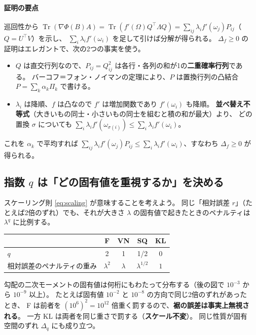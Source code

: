 \documentclass[a4paper,11pt]{ltjsarticle}
\theoremstyle{definition}
\theoremstyle{plain}
\DeclareMathOperator{\Tr}{Tr}
\newcommand{\T}{^{\top}}
\begin{document}
\paragraph{証明の要点}
巡回性から $\Tr(\nabla\Phi(B)A) = \Tr(f'(\Omega)Q\T\Lambda Q) = \sum_{ij}\lambda_if'(\omega_j)P_{ij}$（$Q = U\T V$）を示し、
$\sum_i\lambda_if'(\omega_i)$ を足して引けば分解が得られる。
$\Delta_f\ge0$ の証明はエレガントで、次の2つの事実を使う。
\begin{itemize}
  \item $Q$ は直交行列なので、$P_{ij} = Q_{ij}^2$ は各行・各列の和が1の\textbf{二重確率行列}である。
        バーコフ＝フォン・ノイマンの定理により、$P$ は置換行列の凸結合 $P = \sum_k\alpha_k\Pi_k$ で書ける。
  \item $\lambda_i$ は降順、$f$ は凸なので $f'$ は増加関数であり $f'(\omega_i)$ も降順。
        \textbf{並べ替え不等式}（大きいもの同士・小さいもの同士を組むと積の和が最大）より、
        どの置換 $\sigma$ についても $\sum_i\lambda_if'(\omega_{\sigma(i)})\le\sum_i\lambda_if'(\omega_i)$。
\end{itemize}
これを $\alpha_k$ で平均すれば $\sum_{ij}\lambda_if'(\omega_j)P_{ij}\le\sum_i\lambda_if'(\omega_i)$、すなわち $\Delta_f\ge0$ が得られる。

\subsection{指数 $q$ は「どの固有値を重視するか」を決める}

スケーリング則 \eqref{eq:scaling} が意味することを考えよう。
同じ「相対誤差 $r$」（たとえば2倍のずれ）でも、それが大きさ $\lambda$ の固有値で起きたときのペナルティは $\lambda^q$ に比例する。
\begin{center}
\renewcommand{\arraystretch}{1.2}
\begin{tabular}{lcccc}
\toprule
 & F & VN & SQ & KL\\\midrule
$q$ & 2 & 1 & 1/2 & 0\\
相対誤差のペナルティの重み & $\lambda^2$ & $\lambda$ & $\lambda^{1/2}$ & $1$\\
\bottomrule
\end{tabular}
\end{center}
勾配の二次モーメントの固有値は何桁にもわたって分布する（後の図で $10^{-3}$ から $10^{-9}$ 以上）。
たとえば固有値 $10^{-2}$ と $10^{-8}$ の方向で同じ2倍のずれがあったとき、
F は前者を $(10^6)^2 = 10^{12}$ 倍重く罰するので、\textbf{裾の誤差は事実上無視される}。
一方 KL は両者を同じ重さで罰する（\textbf{スケール不変}）。
同じ性質が固有空間のずれ $\Delta_q$ にも成り立つ。
\end{document}
